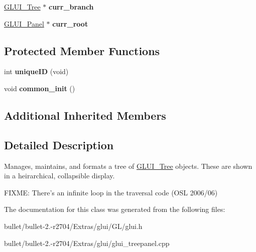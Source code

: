 \begin{DoxyCompactItemize}
\item 
\hypertarget{class_g_l_u_i___tree_panel_a7a62e833115d3c32540406f170de4455}{\hyperlink{class_g_l_u_i___tree}{G\+L\+U\+I\+\_\+\+Tree} $\ast$ {\bfseries curr\+\_\+branch}}\label{class_g_l_u_i___tree_panel_a7a62e833115d3c32540406f170de4455}

\item 
\hypertarget{class_g_l_u_i___tree_panel_a380028a250b33f34afd7e10759813356}{\hyperlink{class_g_l_u_i___panel}{G\+L\+U\+I\+\_\+\+Panel} $\ast$ {\bfseries curr\+\_\+root}}\label{class_g_l_u_i___tree_panel_a380028a250b33f34afd7e10759813356}

\end{DoxyCompactItemize}
\subsection*{Protected Member Functions}
\begin{DoxyCompactItemize}
\item 
\hypertarget{class_g_l_u_i___tree_panel_aeb4b329f0f779c8f289c3efdb9ecd258}{int {\bfseries unique\+I\+D} (void)}\label{class_g_l_u_i___tree_panel_aeb4b329f0f779c8f289c3efdb9ecd258}

\item 
\hypertarget{class_g_l_u_i___tree_panel_a0584049c802c2074a86367053b2d2e20}{void {\bfseries common\+\_\+init} ()}\label{class_g_l_u_i___tree_panel_a0584049c802c2074a86367053b2d2e20}

\end{DoxyCompactItemize}
\subsection*{Additional Inherited Members}


\subsection{Detailed Description}
Manages, maintains, and formats a tree of \hyperlink{class_g_l_u_i___tree}{G\+L\+U\+I\+\_\+\+Tree} objects. These are shown in a heirarchical, collapsible display.

F\+I\+X\+M\+E\+: There's an infinite loop in the traversal code (O\+S\+L 2006/06) 

The documentation for this class was generated from the following files\+:\begin{DoxyCompactItemize}
\item 
bullet/bullet-\/2.-\/r2704/\+Extras/glui/\+G\+L/glui.\+h\item 
bullet/bullet-\/2.-\/r2704/\+Extras/glui/glui\+\_\+treepanel.\+cpp\end{DoxyCompactItemize}
